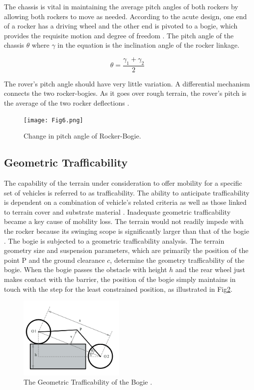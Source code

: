 \documentclass[default,iicol]{sn-jnl}
\theoremstyle{thmstyleone}
\theoremstyle{thmstyletwo}
\theoremstyle{thmstylethree}
\begin{document}
The chassis is vital in maintaining the average pitch angles of both rockers by allowing both rockers to move as needed. According to the acute design, one end of a rocker has a driving wheel and the other end is pivoted to a bogie, which provides the requisite motion and degree of freedom \cite{bib11}.
The pitch angle of the chassis $\theta$ where $\gamma$ in the equation is the inclination angle of the rocker linkage. 

\begin{equation}
\displaystyle{ \theta=\frac{\gamma_{1} + \gamma_2}{2}}
\end{equation}

The rover's pitch angle should have very little variation. A differential mechanism connects the two rocker-bogies. As it goes over rough terrain, the rover's pitch is the average of the two rocker deflections \cite{bib12}.

\begin{figure}[ht]
\centering
\texttt{[image: Fig6.png]}
\caption{Change in pitch angle of  Rocker-Bogie.}\label{fig6}
\end{figure}

\subsection{Geometric Trafficability }\label{subsec6}
The capability of the terrain under consideration to offer mobility for a specific set of vehicles is referred to as trafficability. The ability to anticipate trafficability is dependent on a combination of vehicle's related criteria as well as those linked to terrain cover and substrate material \cite{bib13}. Inadequate geometric trafficability became a key cause of mobility loss. The terrain would not readily impede with the rocker because its swinging scope is significantly larger than that of the bogie \cite{bib14}. The bogie is subjected to a geometric trafficability analysis. The terrain geometry size and suspension parameters, which are primarily the position of the point P and the ground clearance $c$, determine the geometry trafficability of the bogie. When the bogie passes the obstacle with height $h$ and the rear wheel just makes contact with the barrier, the position of the bogie simply maintains in touch with the step for the least constrained position, as illustrated in Fig\ref{fig7}.

\begin{figure}[ht]
\centering
\includegraphics[width=0.46\textwidth]{Fig7.png}
\caption{The Geometric Trafficability of the Bogie \cite{bib1}.}\label{fig7}
\end{figure}
\end{document}
